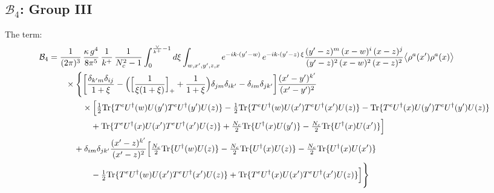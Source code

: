 \documentclass[10pt]{article}
\begin{document}
\subsection*{$\mathcal{B}_{4}$: Group III}
\noindent The term:
\begin{align}
\mathcal{B}_{4}&=\frac{1}{(2\pi)^{3}}\,\frac{\kappa\,g^{4}}{8\pi^{5}}\,\frac{1}{k^{+}}\,\frac{1}{N_{c}^{2}-1}\int_{0}^{\frac{\vee}{k^{+}}-1}d\xi\int_{w,x',y',z,x}e^{-ik\cdot(y'-w)}\,e^{-ik\cdot(y'-z)\,\xi}\frac{(y'-z)^{m}\,(x-w)^{i}\,(x-z)^{j}}{(y'-z)^{2}\,(x-w)^{2}\,(x-z)^{2}}\big\langle\rho^{a}(x')\rho^{a}(x)\big\rangle\notag\\
&\qquad\times\Bigg\{\bigg[\frac{\delta_{k'm}\delta_{ij}}{1+\xi}-\Big(\Big[\frac{1}{\xi(1+\xi)}\Big]_{+}+\frac{1}{1+\xi}\Big)\delta_{jm}\delta_{ik'}-\delta_{im}\delta_{jk'}\bigg]\frac{(x'-y')^{k'}}{(x'-y')^{2}}\notag\\
&\qquad\qquad\times\Big[\tfrac12{\rm Tr}\{T^{e}U^{\dagger}(w)U(y')T^{e}U^{\dagger}(y')U(z)\}-\tfrac12{\rm Tr}\{T^{e}U^{\dagger}(w)U(x')T^{e}U^{\dagger}(x')U(z)\}-{\rm Tr}\{T^{e}U^{\dagger}(x)U(y')T^{e}U^{\dagger}(y')U(z)\}\notag\\
&\qquad\qquad\quad+{\rm Tr}\{T^{e}U^{\dagger}(x)U(x')T^{e}U^{\dagger}(x')U(z)\}+\tfrac{N_{c}}{2}{\rm Tr}\{U^{\dagger}(x)U(y')\}-\tfrac{N_{c}}{2}{\rm Tr}\{U^{\dagger}(x)U(x')\}\Big]\notag\\
&\qquad\quad+\delta_{im}\delta_{jk'}\frac{(x'-z)^{k'}}{(x'-z)^{2}}\Big[\tfrac{N_{c}}{2}{\rm Tr}\{U^{\dagger}(w)U(z)\}-\tfrac{N_{c}}{2}{\rm Tr}\{U^{\dagger}(x)U(z)\}-\tfrac{N_{c}}{2}{\rm Tr}\{U^{\dagger}(x)U(x')\}\notag\\
&\qquad\qquad\quad-\tfrac12{\rm Tr}\{T^{e}U^{\dagger}(w)U(x')T^{e}U^{\dagger}(x')U(z)\}+{\rm Tr}\{T^{e}U^{\dagger}(x)U(x')T^{e}U^{\dagger}(x')U(z)\}\Big]\Bigg\}
\end{align}
\end{document}
